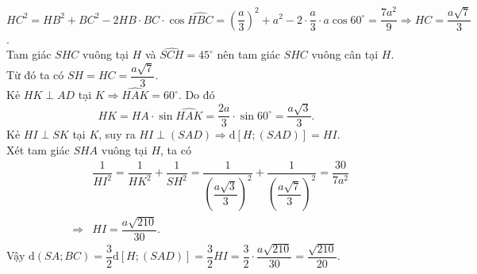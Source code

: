 \begin{ex}
{{}
		\noindent
		$HC^2=HB^2+BC^2-2HB\cdot BC\cdot\cos\widehat{HBC}=\left(\dfrac{a}{3}\right)^2+a^2-2\cdot \dfrac{a}{3}\cdot a\cos60^\circ=\dfrac{7a^2}{9}\Rightarrow HC=\dfrac{a\sqrt{7}}{3}$.\\
		Tam giác $SHC$ vuông tại $H$ và $\widehat{SCH}=45^\circ$ nên tam giác $SHC$ vuông cân tại $H$. Từ đó ta có $SH=HC=\dfrac{a\sqrt{7}}{3}$.\\
		Kẻ $HK\perp AD$ tại $K\Rightarrow \widehat{HAK}=60^\circ$. Do đó 
		$$HK=HA\cdot\sin \widehat{HAK}=\dfrac{2a}{3}\cdot\sin 60^\circ =\dfrac{a\sqrt{3}}{3}.$$
		Kẻ $HI\perp SK$ tại $K$, suy ra $HI\perp (SAD)\Rightarrow \mathrm{d}\left[H;(SAD)\right]=HI$.\\
		Xét tam giác $SHA$ vuông tại $H$, ta có
		\begin{eqnarray*}
			&&\dfrac{1}{HI^2}=\dfrac{1}{HK^2}+\dfrac{1}{SH^2}=\dfrac{1}{\left(\dfrac{a\sqrt{3}}{3}\right)^2}+\dfrac{1}{\left(\dfrac{a\sqrt{7}}{3}\right)^2}=\dfrac{30}{7a^2}\\
			&\Rightarrow & HI=\dfrac{a\sqrt{210}}{30}.
		\end{eqnarray*}
		Vậy $\mathrm{d}\left(SA;BC\right)=\dfrac{3}{2}\mathrm{d}\left[H;(SAD)\right]=\dfrac{3}{2}HI=\dfrac{3}{2}\cdot \dfrac{a\sqrt{210}}{30}=\dfrac{\sqrt{210}}{20}$.
		
	}
\end{ex}%

